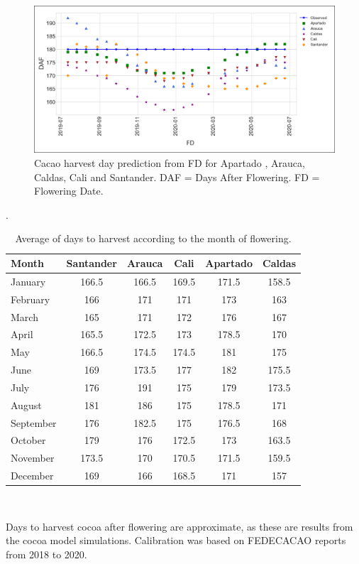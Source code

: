 \documentclass[gene,journal,article,submit,moreauthors,pdftex]{Definitions/mdpi}
\begin{document}
\begin{figure}[h!]
	\centering
	\includegraphics[scale=0.4]{images/RegionHarvest2.png}
	\caption{\footnotesize {Cacao harvest day prediction from FD for Apartado , Arauca, Caldas, Cali  and  Santander. DAF = Days After Flowering. FD = Flowering Date. \\ }} 
	\label{fig:dayH}
\end{figure}.
\newpage

\begin{table}[h!]	
	\caption {\footnotesize {Average of days to harvest according to the month of flowering.}}
	\label{tab:harvest} 
	\centering
	\begin{small}
		{\def\arraystretch{2}\tabcolsep=10pt
		\begin{tabular}{l c c c c c }
			\hline
			{\bf Month }&{\bf Santander }&{\bf Arauca}&{\bf Cali}&{\bf Apartado}&{\bf Caldas}\\
			\hline
			January    & 166.5 & 166.5 & 169.5& 171.5 & 158.5 \\
			February   & 166 & 171 & 171 & 173 & 163  \\
			March      & 165 & 171 & 172 & 176 & 167  \\
			April      & 165.5 & 172.5 & 173& 178.5 & 170   \\
			May       & 166.5 & 174.5 & 174.5&  181& 175   \\
			June      & 169 & 173.5 & 177&  182& 175.5   \\
			July      & 176 & 191 & 175& 179 & 173.5  \\
			August    & 181 & 186 & 175& 178.5 & 171   \\
			September   & 176 & 182.5 & 175& 176.5 & 168   \\
			October    & 179 & 176 & 172.5& 173 & 163.5   \\
			November   & 173.5 & 170 & 170.5&171.5 & 159.5   \\
			December   & 169 & 166 & 168.5& 171 & 157  \\
			\hline
		\end{tabular} \\
	}
		{\footnotesize Days to harvest cocoa after flowering are approximate, as these are results from the cocoa model simulations. Calibration was based on FEDECACAO reports from 2018 to 2020. } 
	\end{small}
\end{table}
\end{document}
